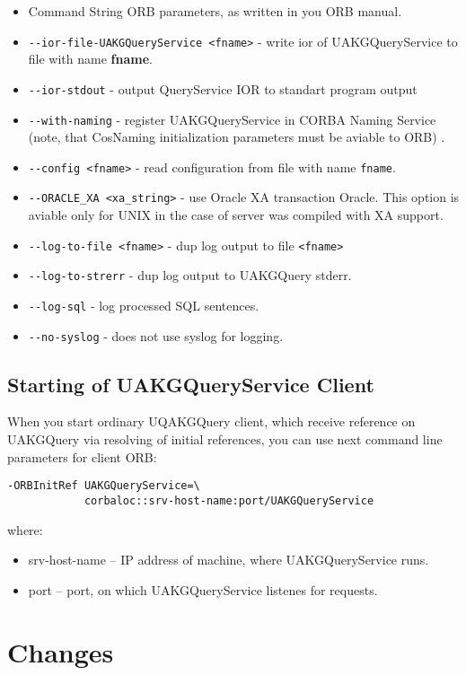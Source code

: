 \documentclass[10pt]{article}
\begin{document}
\begin{itemize}  
 \item Command String ORB parameters, as written in you ORB manual.
 \item \verb|--ior-file-UAKGQueryService <fname>| - write  ior of UAKGQueryService to file with name {\bf fname}. 
 \item \verb|--ior-stdout| - output QueryService IOR to standart program output
 \item \verb|--with-naming| - register UAKGQueryService in CORBA Naming Service (note, that CosNaming initialization parameters must be aviable to ORB) .
 \item \verb|--config <fname>| - read configuration from file with name \verb|fname|.
 \item \verb|--ORACLE_XA <xa_string>| - use Oracle XA transaction Oracle.
       This option is aviable only for UNIX in the case of server was compiled with XA support. 
 \item \verb|--log-to-file <fname>| - dup log output to file \verb|<fname>|
 \item \verb|--log-to-strerr| - dup log output to UAKGQuery stderr.
 \item \verb|--log-sql| - log processed SQL sentences.
 \item \verb|--no-syslog| - does not use syslog for logging.
\end{itemize}

\subsection{ Starting of UAKGQueryService Client }

 When you start ordinary UQAKGQuery client, which receive reference on
UAKGQuery via resolving of initial references, you can use next command line
parameters for client ORB:
\begin{verbatim}
-ORBInitRef UAKGQueryService=\
            corbaloc::srv-host-name:port/UAKGQueryService
\end{verbatim}

where:
\begin{itemize}
  \item srv-host-name -- IP address of machine, where UAKGQueryService runs.
  \item port -- port, on which UAKGQueryService listenes for requests.
\end{itemize}


\section{ Changes }
\end{document}
